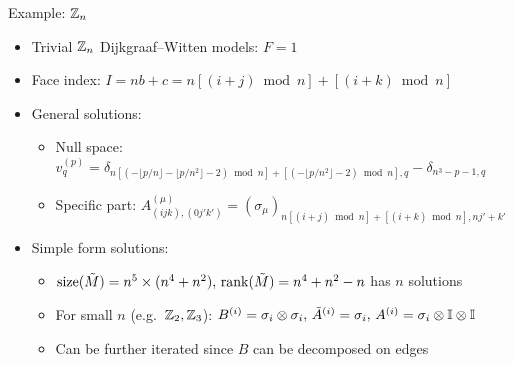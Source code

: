 \documentclass{fdubeamer}
\begin{document}
\begin{frame}{Example: \texorpdfstring{$\mathbb{Z}_n$}{ℤₙ}}

\begin{itemize}
  \item Trivial $\mathbb{Z}_n$ Dijkgraaf--Witten models: $F=1$
  \item Face index: $I = nb + c = n [(i+j)\bmod n] + [(i+k)\bmod n]$
  \item General solutions:

    \begin{itemize}
      \item Null space:
        $
            v^{(p)}_q = \delta_{n [(- \lfloor p/n\rfloor - \lfloor p/n^2 \rfloor - 2) \bmod n] + [(- \lfloor p/n^2 \rfloor - 2) \bmod n], q}
          - \delta_{n^3-p-1, q}
        $
      \item Specific part:
        $A^{(\mu)}_{(ijk), (0j'k')} = (\sigma_\mu)_{n[(i+j)\bmod n]+[(i+k)\bmod n], nj'+k'}$
    \end{itemize}

  \item Simple form solutions:

    \begin{itemize}
      \item $\operatorname{size}(\tilde{M})=n^5\times(n^4+n^2), \, \operatorname{rank}(\tilde{M})=n^4+n^2-n$
        \textrightarrow{} has $n$ solutions
      \item For small $n$ (e.g.\ $\mathbb{Z}_2, \mathbb{Z}_3$):
        $B^{(i)} = \sigma_i \otimes \sigma_i, \, \tilde{A}^{(i)} = \sigma_i, \, A^{(i)} = \sigma_i \otimes \mathbb{I} \otimes \mathbb{I}$
      \item Can be further iterated since $B$ can be decomposed on edges
    \end{itemize}
\end{itemize}

\end{frame}
\end{document}
